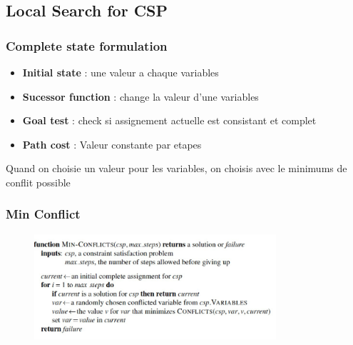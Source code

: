 	\subsection{Local Search for CSP}
		\subsubsection{Complete state formulation}
			\begin{itemize}
				\item \textbf{Initial state} : une valeur a chaque variables
				\item \textbf{Sucessor function} : change la valeur d'une variables
				\item \textbf{Goal test} : check si assignement actuelle est consistant et complet
				\item \textbf{Path cost} : Valeur constante par etapes 
			\end{itemize}
			
			Quand on choisie un valeur pour les variables, on choisis avec le minimums de conflit possible
			
		\subsubsection{Min Conflict}
		
			\begin{figure}[htp]
				\centering
				\includegraphics[width=0.8\textwidth]{img/MinConflict.png}
			\end{figure}
			
